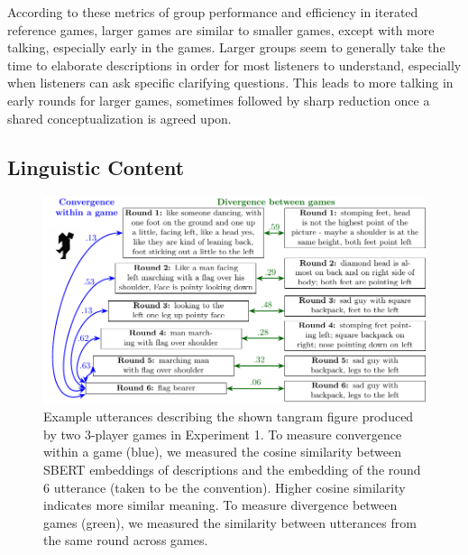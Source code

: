 \documentclass[
  english,
  a4paper,
]{article}
\begin{document}
According to these metrics of group performance and efficiency in iterated reference games, larger games are similar to smaller games, except with more talking, especially early in the games. Larger groups seem to generally take the time to elaborate descriptions in order for most listeners to understand, especially when listeners can ask specific clarifying questions. This leads to more talking in early rounds for larger games, sometimes followed by sharp reduction once a shared conceptualization is agreed upon.

\hypertarget{linguistic-content}{%
\subsection{Linguistic Content}\label{linguistic-content}}

\begin{figure}[t!]

{\centering \includegraphics[width=1\linewidth]{sbert} 

}

\caption{Example utterances describing the shown tangram figure produced by two 3-player games in Experiment 1. To measure convergence within a game (blue), we measured the cosine similarity between SBERT embeddings of descriptions and the embedding of the round 6 utterance (taken to be the convention). Higher cosine similarity indicates more similar meaning. To measure divergence between games (green), we measured the similarity between utterances from the same round across games.}\label{fig:sbert-diagram}
\end{figure}
\end{document}
